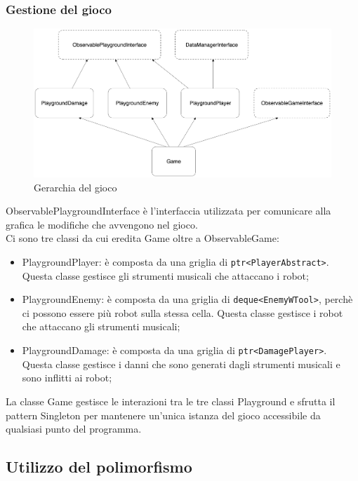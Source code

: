 \documentclass[11pt]{article}
\begin{document}
\subsubsection{Gestione del gioco}

\begin{figure}[ht]
	\centering
	\includegraphics[scale=0.045]{assets/game}
	\caption{Gerarchia del gioco}
\end{figure}

ObservablePlaygroundInterface è l'interfaccia utilizzata per comunicare alla
grafica le modifiche che avvengono nel gioco. \\
Ci sono tre classi da cui eredita Game oltre a ObservableGame:
\begin{itemize}
	\item PlaygroundPlayer: è composta da una griglia di 
		\lstinline|ptr<PlayerAbstract>|. Questa classe gestisce gli strumenti 
		musicali che attaccano i robot;
		 
	\item PlaygroundEnemy: è composta da una griglia di 
		\lstinline|deque<EnemyWTool>|, perchè ci possono essere più robot sulla 
		stessa cella. 
		Questa classe gestisce i robot che attaccano gli strumenti musicali;

	\item PlaygroundDamage: è composta da una griglia di 
		\lstinline|ptr<DamagePlayer>|. 
		Questa classe gestisce i danni che sono generati dagli strumenti 
		musicali e sono inflitti ai robot;
\end{itemize}
La classe Game gestisce le interazioni tra le tre classi Playground e sfrutta il
pattern Singleton per mantenere un'unica istanza del gioco accessibile da
qualsiasi punto del programma.

\subsection{Utilizzo del polimorfismo}
\end{document}
